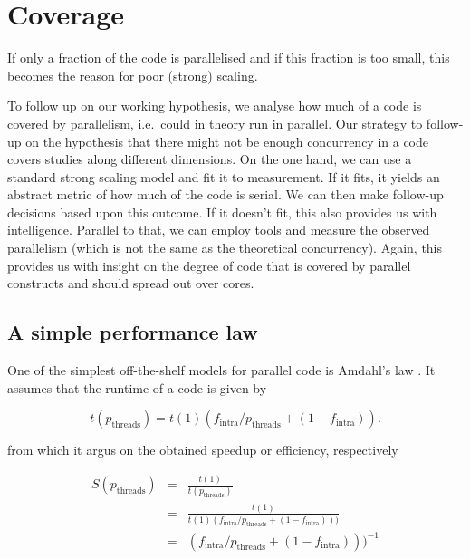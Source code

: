 \section{Coverage}
\label{section:node-level:coverage}


\begin{hypothesis}
 If only a fraction of the code is parallelised and if this fraction is too small, this becomes the reason for poor (strong) scaling.
\end{hypothesis}


To follow up on our working hypothesis, we analyse how much of a code is covered by parallelism, i.e.~could in theory run in parallel.
Our strategy to follow-up on the hypothesis that there might not be enough concurrency in a code covers studies along different dimensions.
On the one hand, we can use a standard strong scaling model and fit it to measurement.
If it fits, it yields an abstract metric of how much of the code is serial. 
We can then make follow-up decisions based upon this outcome.
If it doesn't fit, this also provides us with intelligence.
Parallel to that, we can employ tools and measure the observed parallelism (which is not the same as the theoretical concurrency).
Again, this provides us with insight on the degree of code that is covered by parallel constructs and should spread out over cores.


\subsection{A simple performance law}

One of the simplest off-the-shelf models for parallel code is Amdahl's law \cite{amdahl1967}.
It assumes that the runtime of a code is given by

\begin{equation}
 \label{equation:intra-node:performance-model}
 t(p_{\text{threads}}) =
  t(1)
 \left(
 f_{\text{intra}}/p_{\text{threads}} + (1-f_{\text{intra}}) \right).
\end{equation}

\noindent
from which it argus on the obtained speedup or efficiency,
respectively

\begin{eqnarray}
  S(p_{\text{threads}}) & = & \frac{t(1)}{t(p_{\text{threads}})} 
    \nonumber
    \\
  & = & \frac{t(1)}{t(1)
 \left(
 f_{\text{intra}}/p_{\text{threads}} + (1-f_{\text{intra}}) \right))} 
    \nonumber
    \\
  & = & \left(
 f_{\text{intra}}/p_{\text{threads}} + (1-f_{\text{intra}}) \right))^{-1}
    \label{equation:amdahl:speedup}
\end{eqnarray}

